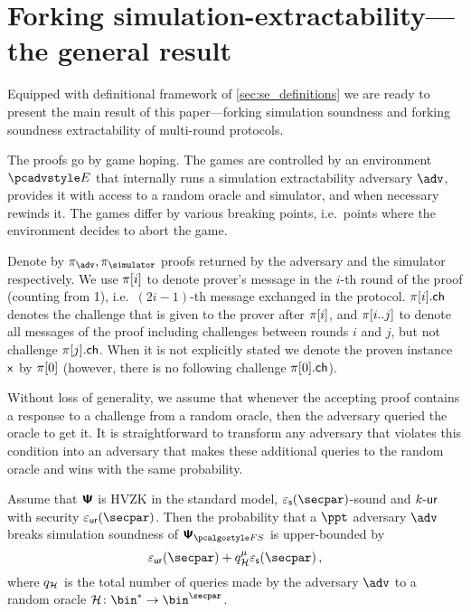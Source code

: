 \documentclass[runningheads,10pt]{llncs}
\begin{document}
\section{Forking simulation-extractability---the general result}
\label{sec:general}
Equipped with definitional framework of \cref{sec:se_definitions} we are ready
to present the main result of this paper---forking simulation soundness and
forking soundness extractability of multi-round protocols.

The proofs go by game hoping. The games are controlled by an environment $\env$
that internally runs a simulation extractability adversary $\advse$, provides it
with access to a random oracle and simulator, and when necessary rewinds it. The
games differ by various breaking points, i.e.~points where the environment
decides to abort the game.

Denote by $\zkproof_{\advse}, \zkproof_{\simulator}$ proofs returned by the
adversary and the simulator respectively. We use $\pi[i]$ to denote
prover's message in the $i$-th round of the proof (counting from 1),
i.e.~$(2i - 1)$-th message exchanged in the protocol. $\pi[i].\mathsf{ch}$ denotes
the challenge that is given to the prover after $\pi[i]$, and
$\pi[i..j]$ to denote all messages of the proof including challenges
between rounds $i$ and $j$, but not challenge $\pi[j].\mathsf{ch}$. When it is not
explicitly stated we denote the proven instance $\mathsf{x}$ by $\pi[0]$
(however, there is no following challenge $\pi[0].\mathsf{ch}$).

Without loss of generality, we assume that whenever the accepting proof contains
a response to a challenge from a random oracle, then the adversary queried the
oracle to get it. It is straightforward to transform any adversary that violates
this condition into an adversary that makes these additional queries to the
random oracle and wins with the same probability.

\begin{theorem}
  \label{thm:simsnd}
  Assume that $\bm{\mathsf{\Psi}}$ is HVZK in the standard model, $\epss(\secpar)$-sound and
  ${k\text{-}\mathsf{ur}}$ with security $\epsur(\secpar)$. Then the probability
  that a $\ppt$ adversary $\adv$ breaks simulation soundness of $\ps_{\fs}$ is
  upper-bounded by
  \[
    \epsur(\secpar) + q_\ro^\mu  \epss(\secpar)\,,
  \]
  where $q_{\mathcal{H}}$ is the total number of queries made by the adversary $\adv$ to a
  random oracle $\ro\colon \bin^{*} \to \bin^{\secpar}$.
\end{theorem}
\end{document}
